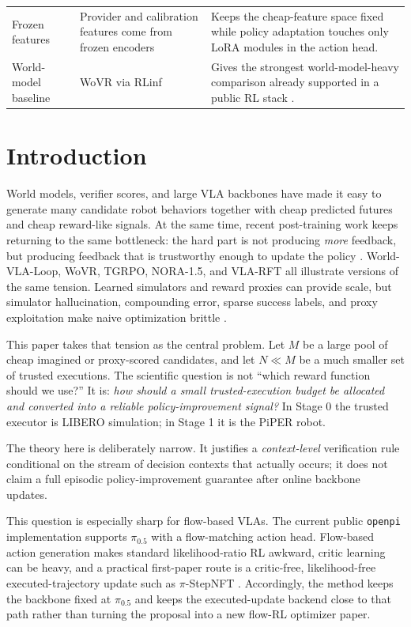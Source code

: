 \documentclass[10pt]{article}
\theoremstyle{plain}
\theoremstyle{definition}
\theoremstyle{remark}
\begin{document}
\begin{table}[H]
\begin{tabularx}{\linewidth}{@{}p{3.4cm}p{3.6cm}X@{}}
Frozen features & Provider and calibration features come from frozen encoders & Keeps the cheap-feature space fixed while policy adaptation touches only LoRA modules in the action head. \\
World-model baseline & WoVR via RLinf & Gives the strongest world-model-heavy comparison already supported in a public RL stack \citep{jiang2026wovr,rlinfrepo2026}. \\
\bottomrule
\end{tabularx}
\end{table}

\section{Introduction}
World models, verifier scores, and large VLA backbones have made it easy to generate many candidate robot behaviors together with cheap predicted futures and cheap reward-like signals. At the same time, recent post-training work keeps returning to the same bottleneck: the hard part is not producing \emph{more} feedback, but producing feedback that is trustworthy enough to update the policy \citep{tan2025riptvla,jiang2026wovr,li2025worldmodelbench}. World-VLA-Loop, WoVR, TGRPO, NORA-1.5, and VLA-RFT all illustrate versions of the same tension. Learned simulators and reward proxies can provide scale, but simulator hallucination, compounding error, sparse success labels, and proxy exploitation make naive optimization brittle \citep{liu2026worldvlaloop,jiang2026wovr,chen2025tgrpo,hung2025nora15,li2025vlarft}.

This paper takes that tension as the central problem. Let $M$ be a large pool of cheap imagined or proxy-scored candidates, and let $N \ll M$ be a much smaller set of trusted executions. The scientific question is not ``which reward function should we use?'' It is: \emph{how should a small trusted-execution budget be allocated and converted into a reliable policy-improvement signal?} In Stage 0 the trusted executor is LIBERO simulation; in Stage 1 it is the PiPER robot.

The theory here is deliberately narrow. It justifies a \emph{context-level} verification rule conditional on the stream of decision contexts that actually occurs; it does not claim a full episodic policy-improvement guarantee after online backbone updates.

This question is especially sharp for flow-based VLAs. The current public \texttt{openpi} implementation supports $\pi_{0.5}$ with a flow-matching action head. Flow-based action generation makes standard likelihood-ratio RL awkward, critic learning can be heavy, and a practical first-paper route is a critic-free, likelihood-free executed-trajectory update such as $\pi$-StepNFT \citep{openpi2026repo,wang2026pistepnft}. Accordingly, the method keeps the backbone fixed at $\pi_{0.5}$ and keeps the executed-update backend close to that path rather than turning the proposal into a new flow-RL optimizer paper.
\end{document}
